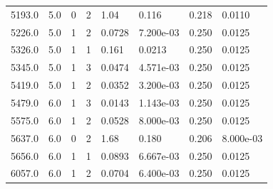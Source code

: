 \documentclass[preview]{standalone}
\begin{document}
{{{\begin{tabular}{L{1.2cm}C{1.2cm} C{0.3cm}C{0.5cm} C{1.4cm}C{1.4cm} C{1.4cm}C{1.4cm}}
  5193.0  &   5.0  & 0     &  2 &  1.04  & 0.116  & 0.218 &  0.0110   \\ 
  5226.0  &   5.0  & 1     &  2 &  0.0728  & 7.200e-03  & 0.250 &  0.0125   \\ 
  5326.0  &   5.0  & 1     &  1 &  0.161  & 0.0213  & 0.250 &  0.0125   \\ 
  5345.0  &   5.0  & 1     &  3 &  0.0474  & 4.571e-03  & 0.250 &  0.0125   \\ 
  5419.0  &   5.0  & 1     &  2 &  0.0352  & 3.200e-03  & 0.250 &  0.0125   \\ 
  5479.0  &   6.0  & 1     &  3 &  0.0143  & 1.143e-03  & 0.250 &  0.0125   \\ 
  5575.0  &   6.0  & 1     &  2 &  0.0528  & 8.000e-03  & 0.250 &  0.0125   \\ 
  5637.0  &   6.0  & 0     &  2 &  1.68  & 0.180  & 0.206 &  8.000e-03   \\ 
  5656.0  &   6.0  & 1     &  1 &  0.0893  & 6.667e-03  & 0.250 &  0.0125   \\ 
  6057.0  &   6.0  & 1     &  2 &  0.0704  & 6.400e-03  & 0.250 &  0.0125   \\ 
\hline 
\end{tabular} 

}}}
\end{document}
